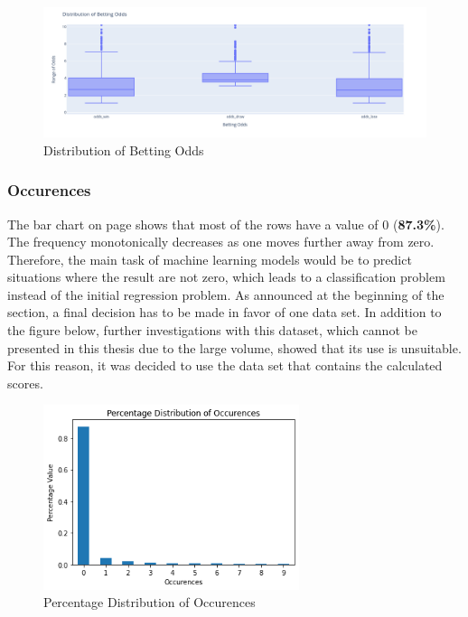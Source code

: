 \begin{figure}[H]
    \centering
    \label{fig:distribution_of_betting_odds}
    \includegraphics[width=16.5cm]{chapter/4_implementation/section/2_data/section/figures/distribution_of_betting_odds.png}
    \captionsetup{justification=centering}
    \caption{Distribution of Betting Odds}
\end{figure}

\subsubsection{Occurences}

The bar chart on page \pageref{fig:percentage_distribution_of_occurrences} shows that most of the rows have a value of 0 (\textbf{87.3\%}). The frequency monotonically decreases as one moves further away from zero. Therefore, the main task of machine learning models would be to predict situations where the result are not zero, which leads to a classification problem instead of the initial regression problem. As announced at the beginning of the section, a final decision has to be made in favor of one data set. In addition to the figure below, further investigations with this dataset, which cannot be presented in this thesis due to the large volume, showed that its use is unsuitable. For this reason, it was decided to use the data set that contains the calculated scores.

\begin{figure}[H]
    \centering
    \includegraphics[width=7.5cm]{chapter/4_implementation/section/2_data/section/figures/percentage_distribution_of_occurences.png}
    \captionsetup{justification=centering}
    \caption{Percentage Distribution of Occurences}
    \label{fig:percentage_distribution_of_occurrences}

\end{figure}


